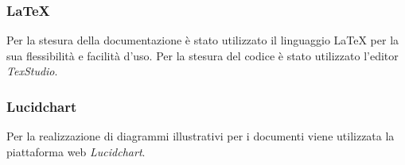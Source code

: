 \documentclass[NormediProgetto.tex]{subfiles}
\begin{document}
\subsubsection{\LaTeX{}}

Per la stesura della documentazione è stato utilizzato il linguaggio \LaTeX{} per la sua flessibilità e facilità d'uso.
Per la stesura del codice è stato utilizzato l’editor \textit{TexStudio}.

\subsubsection{Lucidchart}

Per la realizzazione di diagrammi illustrativi per i documenti viene utilizzata la piattaforma web \textit{Lucidchart}.
\end{document}
